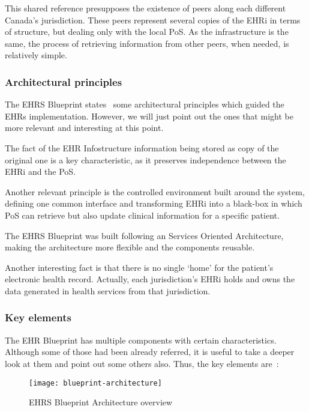This shared reference presupposes the existence of peers along each different Canada's jurisdiction. These peers represent several copies of the EHRi in terms of structure, but dealing only with the local PoS. As the infrastructure is the same, the process of retrieving information from other peers, when needed, is relatively simple.


\subsubsection{Architectural principles}

The EHRS Blueprint states~\citep{April2006} some architectural principles which guided the EHRs implementation. However, we will just point out the ones that might be more relevant and interesting at this point.

The fact of the EHR Infostructure information being stored as copy of the original one is a key characteristic, as it preserves independence between the EHRi and the PoS.

Another relevant principle is the controlled environment built around the system, defining one common interface and transforming EHRi into a black-box in which PoS can retrieve but also update clinical information for a specific patient.

The EHRS Blueprint was built following an Services Oriented Architecture, making the architecture more flexible and the components reusable. 

Another interesting fact is that there is no single `home' for the patient's electronic health record. Actually, each jurisdiction's EHRi holds and owns the data generated in health services from that jurisdiction.

\subsubsection{Key elements}

The EHR Blueprint has multiple components with certain characteristics. Although some of those had been already referred, it is useful to take a deeper look at them and point out some others also. Thus, the key elements are~\citep{April2006}:

\begin{figure}[t]
\centering
\texttt{[image: blueprint-architecture]}
\caption[EHRS Blueprint Architecture overview]%
			{EHRS Blueprint Architecture overview~\citep{Infoway}}
\end{figure}

